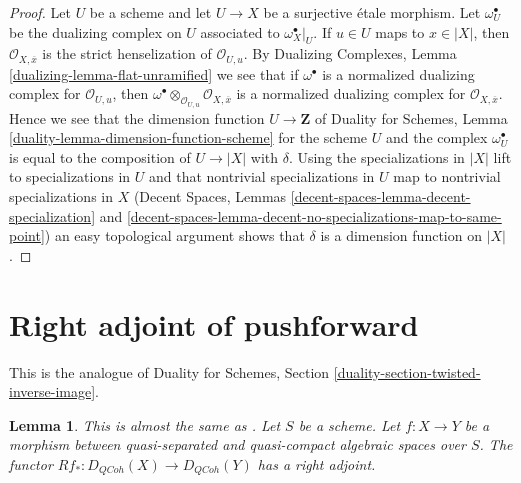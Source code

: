 \documentclass{stacks-project}
\newenvironment{reference}{\comment}{\endcomment}
\theoremstyle{plain}
\newtheorem{lemma}[subsection]{Lemma}
\theoremstyle{definition}
\theoremstyle{remark}
\numberwithin{equation}{subsection}
\def\QCoh{\mathit{QCoh}}
\begin{document}
\begin{proof}
Let $U$ be a scheme and let $U \to X$ be a surjective \'etale morphism.
Let $\omega_U^\bullet$ be the dualizing complex on $U$ associated
to $\omega_X^\bullet|_U$.
If $u \in U$ maps to $x \in |X|$, then $\mathcal{O}_{X, \overline{x}}$
is the strict henselization of $\mathcal{O}_{U, u}$. By
Dualizing Complexes, Lemma \ref{dualizing-lemma-flat-unramified}
we see that if $\omega^\bullet$ is a normalized dualizing complex
for $\mathcal{O}_{U, u}$, then
$\omega^\bullet \otimes_{\mathcal{O}_{U, u}} \mathcal{O}_{X, \overline{x}}$
is a normalized dualizing complex for $\mathcal{O}_{X, \overline{x}}$.
Hence we see that the dimension function $U \to \mathbf{Z}$ of
Duality for Schemes, Lemma \ref{duality-lemma-dimension-function-scheme}
for the scheme $U$ and the complex
$\omega_U^\bullet$ is equal to the composition of $U \to |X|$ with $\delta$.
Using the specializations in $|X|$ lift to specializations in $U$
and that nontrivial specializations in $U$ map to
nontrivial specializations in $X$
(Decent Spaces, Lemmas \ref{decent-spaces-lemma-decent-specialization} and
\ref{decent-spaces-lemma-decent-no-specializations-map-to-same-point})
an easy topological argument shows that $\delta$ is a dimension function
on $|X|$.
\end{proof}






\section{Right adjoint of pushforward}
\label{section-twisted-inverse-image}

\noindent
This is the analogue of Duality for Schemes, Section
\ref{duality-section-twisted-inverse-image}.

\begin{lemma}
\label{lemma-twisted-inverse-image}
\begin{reference}
This is almost the same as \cite[Example 4.2]{Neeman-Grothendieck}.
\end{reference}
Let $S$ be a scheme.
Let $f : X \to Y$ be a morphism between quasi-separated and quasi-compact
algebraic spaces over $S$. The functor $Rf_* : D_\QCoh(X) \to D_\QCoh(Y)$
has a right adjoint.
\end{lemma}
\end{document}
